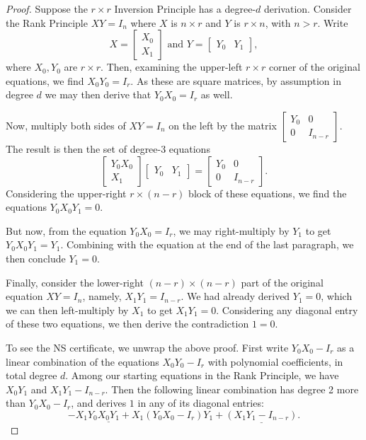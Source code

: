 \begin{proof}
Suppose the $r \times r$ Inversion Principle has a degree-$d$ derivation. Consider the Rank Principle $XY=I_n$ where $X$ is $n \times r$ and $Y$ is $r \times n$, with $n > r$. Write
\[
X = \begin{bmatrix} X_0 \\ X_1 \end{bmatrix} \text{ and } Y = \begin{bmatrix} Y_0 & Y_1 \end{bmatrix},
\]
where $X_0,Y_0$ are $r \times r$. Then, examining the upper-left $r \times r$ corner of the original equations, we find $X_0 Y_0 = I_r$. As these are square matrices, by assumption in degree $d$ we may then derive that $Y_0 X_0 = I_r$ as well.

Now, multiply both sides of $XY=I_n$ on the left by the matrix $\begin{bmatrix} Y_0 & 0 \\ 0 & I_{n-r} \end{bmatrix}$. The result is then the set of degree-3 equations
\[
\begin{bmatrix} Y_0 X_0 \\ X_1 \end{bmatrix} \begin{bmatrix} Y_0 & Y_1 \end{bmatrix} = \begin{bmatrix} Y_0 & 0 \\ 0 & I_{n-r} \end{bmatrix}.
\]
Considering the upper-right $r \times (n-r)$ block of these equations, we find the equations $Y_0 X_0 Y_1 = 0$. 

But now, from the equation $Y_0 X_0 = I_r$, we may right-multiply by $Y_1$ to get $Y_0 X_0 Y_1 = Y_1$. Combining with the equation at the end of the last paragraph, we then conclude $Y_1 = 0$.

Finally, consider the lower-right $(n-r) \times (n-r)$ part of the original equation $XY = I_n$, namely, $X_1 Y_1 = I_{n-r}$. We had already derived $Y_1 = 0$, which we can then left-multiply by $X_1$ to get $X_1 Y_1 = 0$. Considering any diagonal entry of these two equations, we then derive the contradiction $1=0$.

To see the NS certificate, we unwrap the above proof. First write $Y_0 X_0 - I_r$ as a linear combination of the equations $X_0 Y_0 - I_r$ with polynomial coefficients, in total degree $d$. Among our starting equations in the Rank Principle, we have $X_0 Y_1$ and $X_1 Y_1 - I_{n-r}$. Then the following linear combination has degree 2 more than $Y_0 X_0 - I_r$, and derives $1$ in any of its diagonal entries: 
\[
-X_1 Y_0 \underline{X_0 Y_1} + X_1 (Y_0 X_0 - I_r) Y_1 + \underline{(X_1 Y_1 - I_{n-r})}.
\]
\end{proof}

